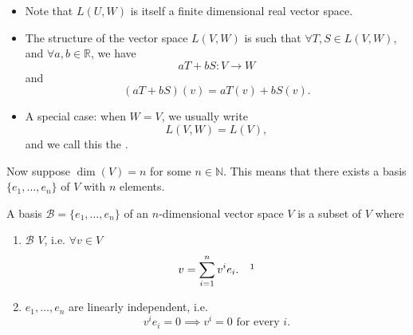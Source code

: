 \documentclass[notoc,notitlepage]{tufte-book}
\begin{document}
\begin{note}
  \begin{itemize}
    \item Note that $L(U, W)$ is itself a finite dimensional real vector space.
    \item The structure of the vector space $L(V, W)$ is such that $\forall T, S \in L(V, W)$, and $\forall a, b \in \mathbb{R}$, we have
      \begin{equation*}
        aT + bS : V \to W
      \end{equation*}
      and
      \begin{equation*}
        (aT + bS)(v) = aT(v) + bS(v).
      \end{equation*}
    \item A special case: when $W = V$, we usually write
      \begin{equation*}
        L(V, W) = L(V),
      \end{equation*}
      and we call this the .
  \end{itemize}
\end{note}

Now suppose $\dim(V) = n$ for some $n \in \mathbb{N}$. This means that there exists a basis $\{ e_1 , \ldots, e_n \}$ of $V$ with $n$ elements.

\begin{defn}[Basis]\label{defn:basis}
  A basis $\mathcal{B} = \{ e_1, \ldots, e_n \}$ of an $n$-dimensional vector space $V$ is a subset of $V$ where
  \begin{enumerate}
    \item $\mathcal{B}$  $V$, i.e. $\forall v \in V$
      \begin{equation*}
        v = \sum_{i=1}^{n} v^i e_i. \quad \footnotemark
      \end{equation*}
    \item $e_1, \ldots, e_n$ are linearly independent, i.e.
      \begin{equation*}
        v^i e_i = 0 \implies v^i = 0 \text{ for every } i.
      \end{equation*}
  \end{enumerate}
\end{defn}
\end{document}
